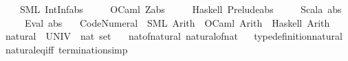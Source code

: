 \begin{isabellebody}
\ \ \ \ {\isacharparenleft}{\kern0pt}SML{\isacharparenright}{\kern0pt}\ {\isachardoublequoteopen}IntInf{\isachardot}{\kern0pt}abs{\isachardoublequoteclose}\isanewline
\ \ \ \ \ {\isacharparenleft}{\kern0pt}OCaml{\isacharparenright}{\kern0pt}\ {\isachardoublequoteopen}Z{\isachardot}{\kern0pt}abs{\isachardoublequoteclose}\isanewline
\ \ \ \ \ {\isacharparenleft}{\kern0pt}Haskell{\isacharparenright}{\kern0pt}\ {\isachardoublequoteopen}Prelude{\isachardot}{\kern0pt}abs{\isachardoublequoteclose}\isanewline
\ \ \ \ \ {\isacharparenleft}{\kern0pt}Scala{\isacharparenright}{\kern0pt}\ {\isachardoublequoteopen}{\isacharunderscore}{\kern0pt}{\isachardot}{\kern0pt}abs{\isachardoublequoteclose}\isanewline
\ \ \ \ \ {\isacharparenleft}{\kern0pt}Eval{\isacharparenright}{\kern0pt}\ {\isachardoublequoteopen}abs{\isachardoublequoteclose}\isanewline
\isanewline
{}\isamarkupfalse%
\isanewline
\ \ \ Code{\isacharunderscore}{\kern0pt}Numeral\ {\isasymrightharpoonup}\ {\isacharparenleft}{\kern0pt}SML{\isacharparenright}{\kern0pt}\ Arith\ \ {\isacharparenleft}{\kern0pt}OCaml{\isacharparenright}{\kern0pt}\ Arith\ \ {\isacharparenleft}{\kern0pt}Haskell{\isacharparenright}{\kern0pt}\ Arith%
\isadelimdocument
%
\endisadelimdocument
%
\isatagdocument
%
\isamarkuptrue%
%
\endisatagdocument
{\isafolddocument}%
%
\isadelimdocument
%
\endisadelimdocument
{}\isamarkupfalse%
\ natural\ {\isacharequal}{\kern0pt}\ {\isachardoublequoteopen}UNIV\ {\isacharcolon}{\kern0pt}{\isacharcolon}{\kern0pt}\ nat\ set{\isachardoublequoteclose}\isanewline
\ \ \ nat{\isacharunderscore}{\kern0pt}of{\isacharunderscore}{\kern0pt}natural\ natural{\isacharunderscore}{\kern0pt}of{\isacharunderscore}{\kern0pt}nat%
\isadelimproof
\ %
\endisadelimproof
%
\isatagproof
\isacommand{{\isachardot}{\kern0pt}{\isachardot}{\kern0pt}}\isamarkupfalse%
%
\endisatagproof
{\isafoldproof}%
%
\isadelimproof
%
\endisadelimproof
\isanewline
\isanewline
{}\isamarkupfalse%
\ type{\isacharunderscore}{\kern0pt}definition{\isacharunderscore}{\kern0pt}natural\isanewline
\isanewline
{}\isamarkupfalse%
\ natural{\isacharunderscore}{\kern0pt}eq{\isacharunderscore}{\kern0pt}iff\ {\isacharbrackleft}{\kern0pt}termination{\isacharunderscore}{\kern0pt}simp{\isacharbrackright}{\kern0pt}{\isacharcolon}{\kern0pt}\isanewline

\end{isabellebody}
